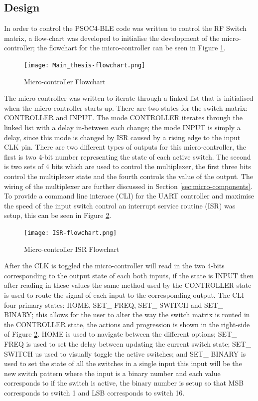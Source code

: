 \documentclass[12pt,openany,a4paper]{book}
\begin{document}
\subsection{Design}
In order to control the PSOC4-BLE code was written to control the RF Switch matrix, a flow-chart was developed to initialise the development of the micro-controller; the flowchart for the micro-controller can be seen in Figure \ref{fig:micro-flowchart}.
\begin{figure}[H]
	\centering
	\texttt{[image: Main\_thesis-flowchart.png]}
	\caption{Micro-controller Flowchart}
	\label{fig:micro-flowchart}
\end{figure} 
The micro-controller was written to iterate through a linked-list that is initialised when the micro-controller starts-up. There are two states for the switch matrix: CONTROLLER and INPUT. The mode CONTROLLER iterates through the linked list with a delay in-between each change; the mode INPUT is simply a delay, since this mode is changed by ISR caused by a rising edge to the input CLK pin. There are two different types of outputs for this micro-controller, the first is two 4-bit number representing the state of each active switch. The second is two sets of 4 bits which are used to control the multiplexer, the first three bits control the multiplexer state and the fourth controls the value of the output. The wiring of the multiplexer are further discussed in Section \ref{sec:micro-components}.\\
To provide a command line interace (CLI) for the UART controller and maximise the speed of the input switch control an interrupt service routine (ISR) was setup, this can be seen in Figure \ref{fig:micro-flowchart-2}.
\begin{figure}[H]
	\centering
	\texttt{[image: ISR-flowchart.png]}
	\caption{Micro-controller ISR Flowchart}
	\label{fig:micro-flowchart-2}
\end{figure} 
After the CLK is toggled the micro-controller will read in the two 4-bits corresponding to the output state of each both inputs, if the state is INPUT then after reading in these values the same method used by the CONTROLLER state is used to route the signal of each input to the corresponding output. The CLI four primary states: HOME, SET\_ FREQ, SET\_ SWITCH and SET\_ BINARY; this allows for the user to alter the way the switch matrix is routed in the CONTROLLER state, the actions and progression is shown in the right-side of Figure \ref{fig:micro-flowchart-2}. HOME is used to navigate between the different options; SET\_ FREQ is used to set the delay between updating the current switch state; SET\_ SWITCH us used to visually toggle the active switches; and SET\_ BINARY is used to set the state of all the switches in a single input this input will be the new switch pattern where the input is a binary number and each value corresponds to if the switch is active, the binary number is setup so that MSB corresponds to switch 1 and LSB corresponds to switch 16.\\[0.2cm]
\end{document}
